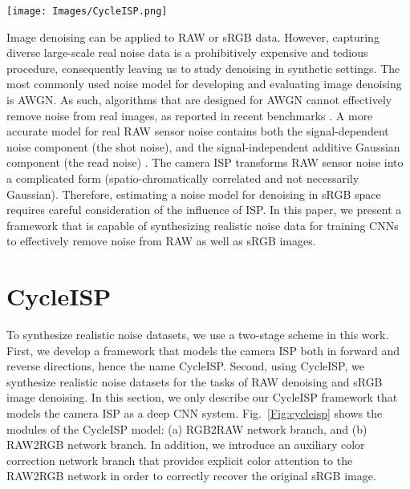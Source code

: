 \documentclass[10pt,twocolumn,letterpaper]{article}
\begin{document}
\begin{figure*}[t!]
\begin{center}
 \texttt{[image: Images/CycleISP.png]}  
\end{center}\vspace{-1.6em}
    \caption{Our CycleISP models the camera imaging pipeline in both directions. It comprises two main branches: RGB2RAW and RAW2RGB. The RGB2RAW branch converts sRGB images to RAW measurements, whereas the RAW2RGB branch transforms RAW data to sRGB images. The auxiliary color correction branch provides explicit color attention to RAW2RGB network. The noise injection module is switched OFF while training the CycleISP (Section~\ref{sec:cycleisp}), and switched ON when synthesizing noise data (Section~\ref{sec:finetune noisy}).}\vspace{-2.5mm}
    \label{Fig:cycleisp}
\end{figure*}




Image denoising can be applied to RAW or sRGB data.
However, capturing diverse large-scale real noise data is a prohibitively expensive and tedious procedure, consequently leaving us to study denoising in synthetic settings. 
The most commonly used noise model for developing and evaluating image denoising is AWGN. 
As such, algorithms that are designed for AWGN cannot effectively remove noise from real images, as reported in recent benchmarks \cite{sidd,dnd}. 
A more accurate model for real RAW sensor noise contains both the signal-dependent noise component (the shot noise), and the  signal-independent additive  Gaussian component (the read noise) \cite{foi2009noisemodel,foi2007noisemodel,foi2008noisemodel}. 
The camera ISP transforms RAW sensor noise into a complicated form (spatio-chromatically correlated and not necessarily Gaussian).
Therefore, estimating a noise model for denoising in sRGB space requires careful consideration of the influence of ISP. 
In this paper, we present a framework that is capable of synthesizing realistic noise data for training CNNs to effectively remove noise from RAW as well as sRGB images.

\section{CycleISP}
\label{sec:cycleisp}
To synthesize realistic noise datasets, we use a two-stage scheme in this work.
First, we develop a framework that models the camera ISP both in forward and reverse directions, 
hence the name CycleISP. 
Second, using CycleISP, we synthesize realistic noise datasets for the tasks of RAW denoising and sRGB image denoising.
In this section, we only describe our CycleISP framework that models the camera ISP as a deep CNN system. 
Fig.~\ref{Fig:cycleisp} shows the modules of the CycleISP model: (a) RGB2RAW network branch, and (b) RAW2RGB network branch.
In addition, we introduce an auxiliary color correction network branch that provides explicit color attention to the RAW2RGB network in order to correctly recover the original sRGB image.   
\end{document}
